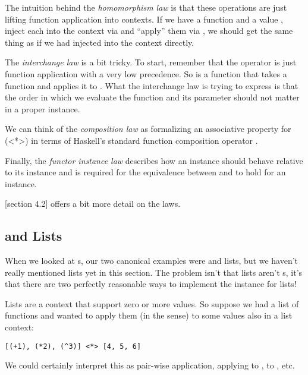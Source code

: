The intuition behind the \textit{homomorphism law} is that these operations are just lifting function application into
 contexts. If we have a function  and a value , inject each into the context
via  and ``apply'' them via \code{(<*>)}, we should get the same thing as if we had injected
 into the context directly.

The \textit{interchange law} is a bit tricky. To start, remember that the \code{(\$)} operator is just function application
with a very low precedence. So  is a function that takes a function and applies it to .
What the interchange law is trying to express is that the order in which we evaluate the function and its 
parameter should not matter in a proper  instance.

We can think of the \textit{composition law} as formalizing an associative property for \code(<*>) in terms 
of Haskell's standard function composition operator .

Finally, the \textit{functor instance law} describes how an  instance should behave relative to
its  instance and is required for the equivalence between \code{(<\$>)} and  to hold for
an  instance.

\cite{typeclassopedia}[section 4.2] offers a bit more detail on the  laws.

\subsection{ and Lists}

When we looked at s, our two canonical examples were  and lists, but we haven't really mentioned
lists yet in this section. The problem isn't that lists aren't s, it's that there are two perfectly
reasonable ways to implement the  instance for lists!

Lists are a context that support zero or more values. So suppose we had a list of functions and wanted to apply them
(in the  sense) to some values also in a list context: 

\begin{lstlisting}
[(+1), (*2), (^3)] <*> [4, 5, 6]
\end{lstlisting}

We could certainly interpret this as pair-wise application, applying  to ,  to , etc.

